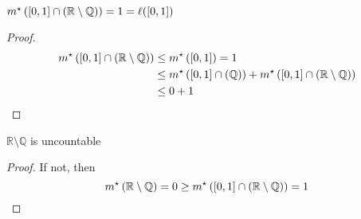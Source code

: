 \begin{corollary}
    $m^{\star}\left([0,1] \cap (\mathbb{R} \setminus \mathbb{Q})\right) = 1 = \ell([0,1])$
\end{corollary}
\begin{proof}
    \begin{align*}
        m^{\star}\left([0,1] \cap (\mathbb{R} \setminus \mathbb{Q})\right) &\leq m^{\star}\left([0,1]\right) = 1 \\
        &\leq m^{\star}\left([0,1] \cap (\mathbb{Q})\right) + m^{\star}\left([0,1] \cap (\mathbb{R} \setminus \mathbb{Q})\right) \\
        &\leq 0 + 1
    \end{align*}
\end{proof}

\begin{corollary}
    $\mathbb{R} \setminus \mathbb{Q}$ is uncountable
\end{corollary}
\begin{proof}
    If not, then
    \[
        m^{\star}\left(\mathbb{R} \setminus \mathbb{Q}\right) = 0 \geq m^{\star}\left([0,1] \cap (\mathbb{R} \setminus \mathbb{Q})\right) = 1 \qedhere
    \]
\end{proof}